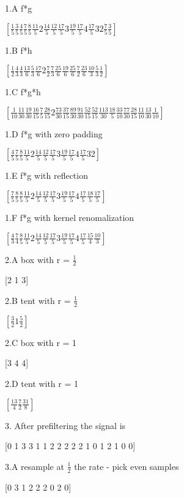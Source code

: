\documentclass[11pt]{article}
\begin{document}
1.A f*g

	$[ \frac{1}{5} \frac{3}{5} \frac{4}{5} \frac{7}{5} \frac{8}{5} \frac{11}{5} 2 \frac{14}{5} \frac{12}{5} \frac{17}{5} 3 \frac{19}{5} \frac{17}{5} 4 \frac{17}{5} 3 2 \frac{7}{5} \frac{3}{5} ]$
	
1.B f*h

	$[ \frac{1}{2} \frac{4}{3} \frac{4}{3} \frac{13}{6} \frac{5}{3} \frac{17}{6} 2 \frac{7}{2} \frac{7}{3} \frac{25}{6} \frac{19}{6} \frac{25}{6} \frac{7}{2} \frac{23}{6} \frac{10}{3} \frac{5}{3} \frac{1}{2} ]$
	
1.C f*g*h

	$[ \frac{1}{10} \frac{11}{30} \frac{19}{30} \frac{16}{15} \frac{7}{5} \frac{28}{15} 2 \frac{73}{30} \frac{37}{15} \frac{89}{30} \frac{91}{30} \frac{52}{15} \frac{52}{15} \frac{113}{30} \frac{18}{5} \frac{33}{10} \frac{77}{30} \frac{28}{15} \frac{11}{10} \frac{13}{30} \frac{1}{10} ]$

1.D f*g with zero padding

	$[ \frac{4}{5} \frac{7}{5} \frac{8}{5} \frac{11}{5} 2 \frac{14}{5} \frac{12}{5} \frac{17}{5} 3 \frac{19}{5} \frac{17}{5} 4 \frac{17}{5} 3 2 ]$

1.E f*g with reflection

	$[ \frac{7}{5} \frac{8}{5} \frac{8}{5} \frac{11}{5} 2 \frac{14}{5} \frac{12}{5} \frac{17}{5} 3 \frac{19}{5} \frac{17}{5} 4 \frac{17}{5} \frac{18}{5} \frac{17}{5} ]$

1.F f*g with kernel renomalization

	$[ \frac{4}{3} \frac{7}{4} \frac{8}{5} \frac{11}{5} 2 \frac{14}{5} \frac{12}{5} \frac{17}{5} 3 \frac{19}{5} \frac{17}{5} 4 \frac{17}{5} \frac{15}{4} \frac{10}{3} ]$


2.A box with r = $\frac{1}{2}$

	[2 1 3]

2.B tent with r = $\frac{1}{2}$

	$[\frac{3}{2} 1 \frac{5}{2}]$

2.C box with r = 1

	[3 4 4]

2.D tent with r = 1

	$[\frac{13}{4} \frac{7}{2} \frac{31}{8}]$


3. After prefiltering the signal is
	
	[0 1 3 3 1 1 2 2 2 2 2 1 0 1 2 1 0 0]

3.A resample at $\frac{1}{2}$ the rate - pick even samples

	[0 3 1 2 2 2 0 2 0]
\end{document}
